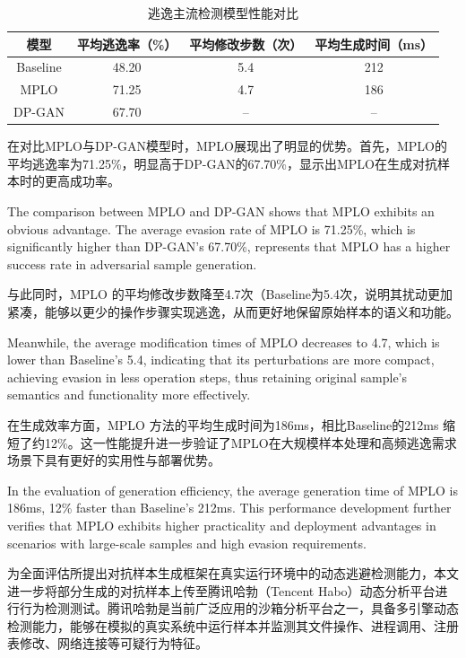 \begin{table}[htbp]
	\centering
	\caption{逃逸主流检测模型性能对比}
	\label{tab:5.10}
	\begin{tabular*}{0.9\textwidth}{@{\extracolsep{\fill}}cccc}
		\toprule
		模型 & 平均逃逸率（\%） & 平均修改步数（次） & 平均生成时间（ms） \\
		\midrule
		Baseline & 48.20 & 5.4 & 212 \\
		MPLO & 71.25 & 4.7 & 186 \\
		DP-GAN & 67.70 & -- & -- \\
		\bottomrule
	\end{tabular*}
\end{table}

在对比MPLO与DP-GAN模型时，MPLO展现出了明显的优势。首先，MPLO的平均逃逸率为71.25\%，明显高于DP-GAN的67.70\%，显示出MPLO在生成对抗样本时的更高成功率。

The comparison between MPLO and DP-GAN shows that MPLO exhibits an obvious advantage. The average evasion rate of MPLO is 71.25\%, which is significantly higher than DP-GAN's 67.70\%, represents that MPLO has a higher success rate in adversarial sample generation.

与此同时，MPLO 的平均修改步数降至4.7次（Baseline为5.4次，说明其扰动更加紧凑，能够以更少的操作步骤实现逃逸，从而更好地保留原始样本的语义和功能。

Meanwhile, the average modification times of MPLO decreases to 4.7, which is lower than Baseline's 5.4, indicating that its perturbations are more compact, achieving evasion in less operation steps, thus retaining original sample's semantics and functionality more effectively.

在生成效率方面，MPLO 方法的平均生成时间为186ms，相比Baseline的212ms 缩短了约12\%。这一性能提升进一步验证了MPLO在大规模样本处理和高频逃逸需求场景下具有更好的实用性与部署优势。

In the evaluation of generation efficiency, the average generation time of MPLO is 186ms, 12\% faster than Baseline's 212ms. This performance development further verifies that MPLO exhibits higher practicality and deployment advantages in scenarios with large-scale samples and high evasion requirements.

为全面评估所提出对抗样本生成框架在真实运行环境中的动态逃避检测能力，本文进一步将部分生成的对抗样本上传至腾讯哈勃（Tencent Habo）动态分析平台进行行为检测测试。腾讯哈勃是当前广泛应用的沙箱分析平台之一，具备多引擎动态检测能力，能够在模拟的真实系统中运行样本并监测其文件操作、进程调用、注册表修改、网络连接等可疑行为特征。

